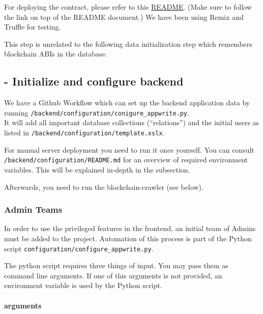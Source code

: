 \documentclass[
]{article}
\begin{document}
For deploying the contract, please refer to this
\href{https://github.com/amosproj/amos2021ws07-nft-development/blob/main/blockchain/README.md}{README}.
(Make sure to follow the link on top of the README document.) We have
been using Remix and Truffle for testing.

This step is unrelated to the following data initialization step which
remembers blockchain ABIs in the database.

\hypertarget{initialize-and-configure-backend}{%
\subsection{- Initialize and configure
backend}\label{initialize-and-configure-backend}}

We have a Github Workflow which can set up the backend application data
by running \texttt{/backend/configuration/conigure\_appwrite.py}.\\
It will add all important database collections (``relations'') and the
initial users as listed in
\texttt{/backend/configuration/template.xslx}.

For manual server deployment you need to run it once yourself. You can
consult \texttt{/backend/configuration/README.md} for an overview of
required environment variables. This will be explained in-depth in the
subsection.

Afterwards, you need to run the blockchain-crawler (see below).

\hypertarget{admin-teams}{%
\subsubsection{Admin Teams}\label{admin-teams}}

In order to use the privileged features in the frontend, an initial team
of Admins must be added to the project. Automation of this process is
part of the Python script \texttt{configuration/configure\_appwrite.py}.

The python script requires three things of input. You may pass them as
command line arguments. If one of this arguments is not provided, an
environment variable is used by the Python script.

\hypertarget{arguments}{%
\paragraph{arguments}\label{arguments}}
\end{document}
